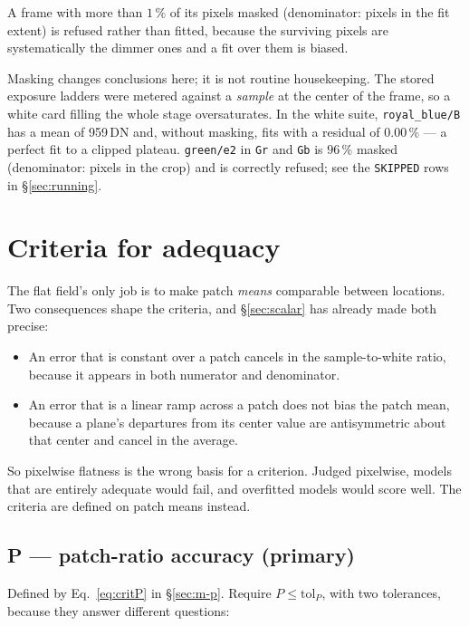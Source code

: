 \documentclass[11pt, a4paper]{article}
\newcommand{\code}[1]{\texttt{#1}}
\newcommand{\pct}{\,\%}
\begin{document}
A frame with more than $1\pct$ of its pixels masked
(denominator: pixels in the fit extent)
is refused rather than fitted,
because the surviving pixels are systematically the dimmer ones
and a fit over them is biased.

Masking changes conclusions here; it is not routine housekeeping.
The stored exposure ladders were metered against a \emph{sample}
at the center of the frame,
so a white card filling the whole stage oversaturates.
In the white suite,
\code{royal\_blue/B} has a mean of 959\,DN and,
without masking,
fits with a residual of $0.00\pct$ ---
a perfect fit to a clipped plateau.
\code{green/e2} in \code{Gr} and \code{Gb} is $96\pct$ masked
(denominator: pixels in the crop)
and is correctly refused;
see the \code{SKIPPED} rows in \S\ref{sec:running}.

\section{Criteria for adequacy}
\label{sec:criteria}

The flat field's only job is to make patch \emph{means} comparable
between locations.
Two consequences shape the criteria,
and \S\ref{sec:scalar} has already made both precise:

\begin{itemize}[nosep]
  \item An error that is constant over a patch cancels in the
        sample-to-white ratio,
        because it appears in both numerator and denominator.
  \item An error that is a linear ramp across a patch does not bias the
        patch mean,
        because a plane's departures from its center value are
        antisymmetric about that center and cancel in the average.
\end{itemize}

So pixelwise flatness is the wrong basis for a criterion.
Judged pixelwise, models that are entirely adequate would fail,
and overfitted models would score well.
The criteria are defined on patch means instead.

\subsection{P --- patch-ratio accuracy (primary)}

Defined by Eq.~\ref{eq:critP} in \S\ref{sec:m-p}.
Require $P \le \mathrm{tol}_P$,
with two tolerances, because they answer different questions:
\end{document}
